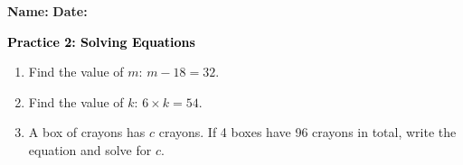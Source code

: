 \documentclass[12pt, letterpaper, fleqn]{article}
\begin{document}
\textbf{Name:} \underline{\hspace{5cm}}
\hfill
\textbf{Date:} \underline{\hspace{3cm}}\\

\begin{tcolorbox}[colback=customteal!20]
    \large\textcolor{black}{\textbf{Practice 2: Solving Equations}}
\end{tcolorbox}
\begin{enumerate}[itemsep=3.5cm, leftmargin=0.6cm]
\item Find the value of $m$: $m - 18 = 32$.
\vspace{3cm}
\item Find the value of $k$: $6 \times k = 54$.
\vspace{3cm}
\item A box of crayons has $c$ crayons. If 4 boxes have 96 crayons in total, write the equation and solve for $c$.
\end{enumerate}
\end{document}
